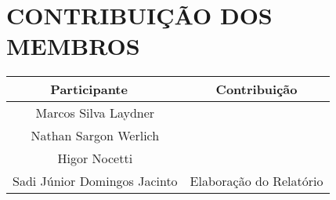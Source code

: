 \section{\normalsize CONTRIBUIÇÃO DOS MEMBROS}
	\begin{table}[h]
		\begin{center}
		\begin{tabular}{|c|c|}
		\hline
			{\bf Participante} \	& {\bf Contribuição}\\\hline
			Marcos Silva Laydner & \\\hline
			Nathan Sargon Werlich & \\\hline
			Higor Nocetti & \\\hline
			Sadi Júnior Domingos Jacinto & Elaboração do Relatório\\\hline
		\end{tabular}
		\end{center}
	\end{table}